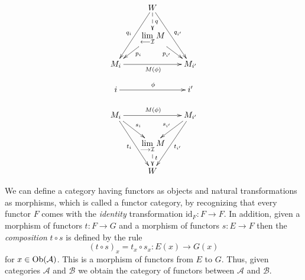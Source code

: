 \begin{frame}
\begin{displaymath}
\xymatrix@=17pt{
&\ar[ldd]_{q_i} W \ar@{-->}[d]^{q} \ar[rdd]^{q_{i'}} & \\
& \ar[ld]^{p_i} \lim\limits_{\longleftarrow \mathcal{I}} M \ar[rd]_{p_{i'}} &\\
M_i  \ar[rr]_{M(\phi)} & & M_{i'} \\
i \ar[rr]^{\phi} & & i' \\
M_i \ar[rd]^{s_i} \ar[rdd]_{t_i} \ar[rr]^{M(\phi)} & & M_{i'} \ar[ldd]^{t_{i'}} \ar[ld]_{s_{i'}}\\
& \lim\limits_{\longrightarrow \mathcal{I}} M \ar@{-->}[d]^{t}& \\
& W &
}
\end{displaymath}
\end{frame}

\begin{frame}
We can define a category having functors as objects and natural transformations as morphisms, which is called a functor category, by recognizing that every functor $F$ comes with the {\it identity} transformation $\text{id}_F : F \to F$. In addition, given a morphism of
functors $t : F \to G$ and a morphism of functors $s : E \to F$
then the {\it composition} $t \circ s$ is defined by the rule
$$
(t \circ s)_x = t_x \circ s_x : E(x) \to G(x)
$$
for $x \in \mathop{\rm Ob}\nolimits(\mathcal{A})$.
This is a morphism of functors
from $E$ to $G$.
Thus, given categories
$\mathcal{A}$ and $\mathcal{B}$ we obtain the category of functors between $\mathcal{A}$ and
$\mathcal{B}$.
\end{frame}



